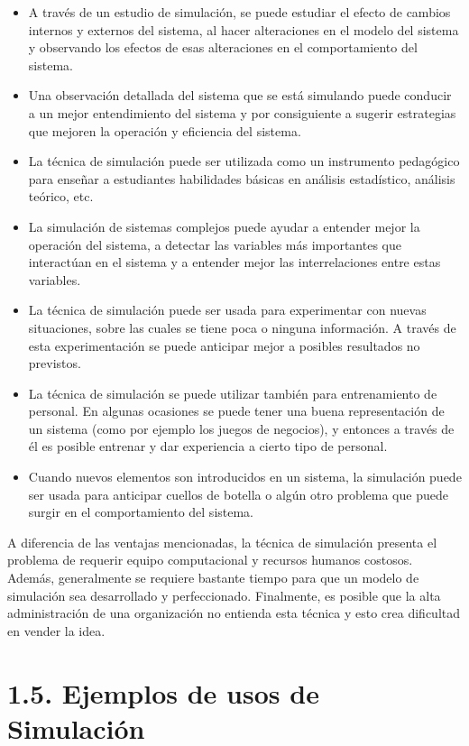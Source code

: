 \documentclass[11pt,letterpaper]{report}
\begin{document}
\begin{itemize}[leftmargin=*]
\item A través de un estudio de simulación, se puede estudiar el efecto
de cambios internos y externos del sistema, al hacer alteraciones en el
modelo del sistema y observando los efectos de esas alteraciones en el
comportamiento del sistema.
\item Una observación detallada del sistema que se está simulando puede
conducir a un mejor entendimiento del sistema y por consiguiente a
sugerir estrategias que mejoren la operación y eficiencia del sistema.
\item La técnica de simulación puede ser utilizada como un instrumento
pedagógico para enseñar a estudiantes habilidades básicas en análisis
estadístico, análisis teórico, etc.
\item La simulación de sistemas complejos puede ayudar a entender mejor
la operación del sistema, a detectar las variables más importantes que
interactúan en el sistema y a entender mejor las interrelaciones entre
estas variables.
\item La técnica de simulación puede ser usada para experimentar con
nuevas situaciones, sobre las cuales se tiene poca o ninguna información.
A través de esta experimentación se puede anticipar mejor a posibles
resultados no previstos.
\item La técnica de simulación se puede utilizar también para
entrenamiento de personal. En algunas ocasiones se puede tener una buena
representación de un sistema (como por ejemplo los juegos de negocios),
y entonces a través de él es posible entrenar y dar experiencia a cierto
tipo de personal.
\item Cuando nuevos elementos son introducidos en un sistema, la
simulación puede ser usada para anticipar cuellos de botella o algún
otro problema que puede surgir en el comportamiento del sistema.
\end{itemize}

A diferencia de las ventajas mencionadas, la técnica de simulación
presenta el problema de requerir equipo computacional y recursos humanos
costosos. Además, generalmente se requiere bastante tiempo para que un
modelo de simulación sea desarrollado y perfeccionado. Finalmente, es
posible que la alta administración de una organización no entienda esta
técnica y esto crea dificultad en vender la idea.

\section*{1.5. Ejemplos de usos de Simulación}
\end{document}
